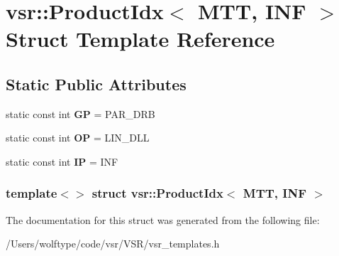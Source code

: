 \hypertarget{structvsr_1_1_product_idx_3_01_m_t_t_00_01_i_n_f_01_4}{\section{vsr\-:\-:Product\-Idx$<$ M\-T\-T, I\-N\-F $>$ Struct Template Reference}
\label{structvsr_1_1_product_idx_3_01_m_t_t_00_01_i_n_f_01_4}
}
\subsection*{Static Public Attributes}
\begin{DoxyCompactItemize}
\item 
\hypertarget{structvsr_1_1_product_idx_3_01_m_t_t_00_01_i_n_f_01_4_aff8349a6a1764748d2599f936e7cefb7}{static const int {\bfseries G\-P} = P\-A\-R\-\_\-\-D\-R\-B}\label{structvsr_1_1_product_idx_3_01_m_t_t_00_01_i_n_f_01_4_aff8349a6a1764748d2599f936e7cefb7}

\item 
\hypertarget{structvsr_1_1_product_idx_3_01_m_t_t_00_01_i_n_f_01_4_ac8a3cf0af8b0ed9f888e04ab06e00203}{static const int {\bfseries O\-P} = L\-I\-N\-\_\-\-D\-L\-L}\label{structvsr_1_1_product_idx_3_01_m_t_t_00_01_i_n_f_01_4_ac8a3cf0af8b0ed9f888e04ab06e00203}

\item 
\hypertarget{structvsr_1_1_product_idx_3_01_m_t_t_00_01_i_n_f_01_4_a38e00436fb95a542aef1ec5f55c4584b}{static const int {\bfseries I\-P} = I\-N\-F}\label{structvsr_1_1_product_idx_3_01_m_t_t_00_01_i_n_f_01_4_a38e00436fb95a542aef1ec5f55c4584b}

\end{DoxyCompactItemize}
\subsubsection*{template$<$$>$ struct vsr\-::\-Product\-Idx$<$ M\-T\-T, I\-N\-F $>$}



The documentation for this struct was generated from the following file\-:\begin{DoxyCompactItemize}
\item 
/\-Users/wolftype/code/vsr/\-V\-S\-R/vsr\-\_\-templates.\-h\end{DoxyCompactItemize}
